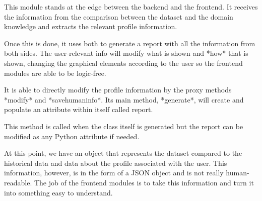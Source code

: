 This module stands at the edge between the backend and the frontend. It receives the information from the comparison between the dataset and the domain knowledge and extracts the relevant profile information.

Once this is done, it uses both to generate a report with all the information from both sides. The user-relevant info will modify what is shown and *how* that is shown, changing the graphical elements according to the user so the frontend modules are able to be logic-free.

It is able to directly modify the profile information by the proxy methods *modify* and *savehumaninfo*. Its main method, *generate*, will create and populate an attribute within itself called report.

This method is called when the class itself is generated but the report can be modified as any Python attribute if needed.

At this point, we have an object that represents the dataset compared to the historical data and data about the profile associated with the user. This information, however, is in the form of a JSON object and is not really human-readable. The job of the frontend modules is to take this information and turn it into something easy to understand.

